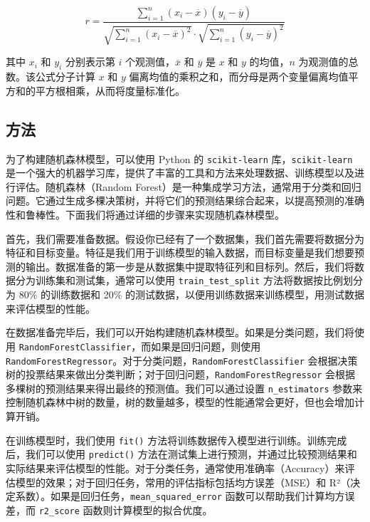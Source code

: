 \documentclass[AutoFakeBold]{LZUThesis-PgD&PhD}
\begin{document}
	\[
	r = \frac{\sum_{i=1}^{n} (x_i - \overline{x})(y_i - \overline{y})}{\sqrt{\sum_{i=1}^{n} (x_i - \overline{x})^2} \cdot \sqrt{\sum_{i=1}^{n} (y_i - \overline{y})^2}}
	\]
	
	其中 \( x_i \) 和 \( y_i \) 分别表示第 \( i \) 个观测值，\( \overline{x} \) 和 \( \overline{y} \) 是 \( x \) 和 \( y \) 的均值，\( n \) 为观测值的总数。该公式分子计算 \( x \) 和 \( y \) 偏离均值的乘积之和，而分母是两个变量偏离均值平方和的平方根相乘，从而将度量标准化。
	
		\subsection{方法}
	
        为了构建随机森林模型，可以使用 Python 的 \texttt{scikit-learn} 库，\texttt{scikit-learn} 是一个强大的机器学习库，提供了丰富的工具和方法来处理数据、训练模型以及进行评估。随机森林（Random Forest）是一种集成学习方法，通常用于分类和回归问题。它通过生成多棵决策树，并将它们的预测结果综合起来，以提高预测的准确性和鲁棒性。下面我们将通过详细的步骤来实现随机森林模型。

        首先，我们需要准备数据。假设你已经有了一个数据集，我们首先需要将数据分为特征和目标变量。特征是我们用于训练模型的输入数据，而目标变量是我们想要预测的输出。数据准备的第一步是从数据集中提取特征列和目标列。然后，我们将数据分为训练集和测试集，通常可以使用 \texttt{train\_test\_split} 方法将数据按比例划分为 80\% 的训练数据和 20\% 的测试数据，以便用训练数据来训练模型，用测试数据来评估模型的性能。
        
        在数据准备完毕后，我们可以开始构建随机森林模型。如果是分类问题，我们将使用 \texttt{RandomForestClassifier}，而如果是回归问题，则使用 \texttt{RandomForestRegressor}。对于分类问题，\texttt{RandomForestClassifier} 会根据决策树的投票结果来做出分类判断；对于回归问题，\texttt{RandomForestRegressor} 会根据多棵树的预测结果来得出最终的预测值。我们可以通过设置 \texttt{n\_estimators} 参数来控制随机森林中树的数量，树的数量越多，模型的性能通常会更好，但也会增加计算开销。
        
        在训练模型时，我们使用 \texttt{fit()} 方法将训练数据传入模型进行训练。训练完成后，我们可以使用 \texttt{predict()} 方法在测试集上进行预测，并通过比较预测结果和实际结果来评估模型的性能。对于分类任务，通常使用准确率（Accuracy）来评估模型的效果；对于回归任务，常用的评估指标包括均方误差（MSE）和 R²（决定系数）。如果是回归任务，\texttt{mean\_squared\_error} 函数可以帮助我们计算均方误差，而 \texttt{r2\_score} 函数则计算模型的拟合优度。
        
\end{document}
